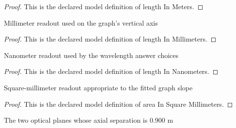 \begin{proof}
  This is the declared model definition of length In Meters.
\end{proof}
\begin{definition}
  \label{def:physics:phyx-mini-0119:phyxminiproblems-problemphyxmini0119-lengthinmillimeters}
  Millimeter readout used on the graph's vertical axis
\end{definition}
\begin{proof}
  This is the declared model definition of length In Millimeters.
\end{proof}
\begin{definition}
  \label{def:physics:phyx-mini-0119:phyxminiproblems-problemphyxmini0119-lengthinnanometers}
  Nanometer readout used by the wavelength answer choices
\end{definition}
\begin{proof}
  This is the declared model definition of length In Nanometers.
\end{proof}
\begin{definition}
  \label{def:physics:phyx-mini-0119:phyxminiproblems-problemphyxmini0119-areainsquaremillimeters}
  Square-millimeter readout appropriate to the fitted graph slope
\end{definition}
\begin{proof}
  This is the declared model definition of area In Square Millimeters.
\end{proof}
\begin{definition}
  \label{def:physics:phyx-mini-0119:phyxminiproblems-problemphyxmini0119-opticalplane}
  The two optical planes whose axial separation is 0.900 m
\end{definition}
